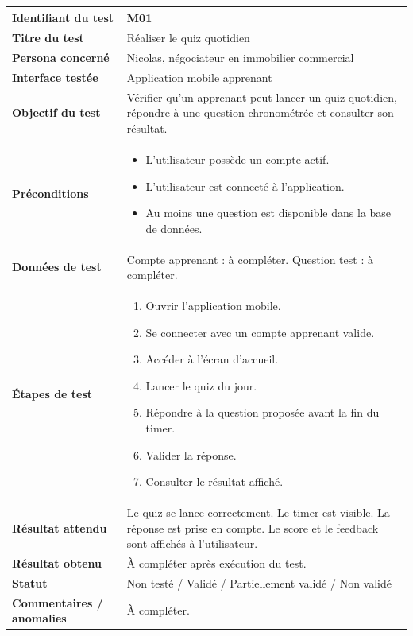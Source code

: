 \begin{longtable}{|p{4cm}|p{10cm}|}
\textbf{Identifiant du test} & M01 \\ \hline
\textbf{Titre du test} & Réaliser le quiz quotidien \\ \hline
\textbf{Persona concerné} & Nicolas, négociateur en immobilier commercial \\ \hline
\textbf{Interface testée} & Application mobile apprenant \\ \hline
\textbf{Objectif du test} & Vérifier qu'un apprenant peut lancer un quiz quotidien, répondre à une question chronométrée et consulter son résultat. \\ \hline
\textbf{Préconditions} & 
\begin{itemize}
    \item L'utilisateur possède un compte actif.
    \item L'utilisateur est connecté à l'application.
    \item Au moins une question est disponible dans la base de données.
\end{itemize}
\\ \hline
\textbf{Données de test} & 
Compte apprenant : à compléter. \newline
Question test : à compléter. \\ \hline
\textbf{Étapes de test} &
\begin{enumerate}
    \item Ouvrir l'application mobile.
    \item Se connecter avec un compte apprenant valide.
    \item Accéder à l'écran d'accueil.
    \item Lancer le quiz du jour.
    \item Répondre à la question proposée avant la fin du timer.
    \item Valider la réponse.
    \item Consulter le résultat affiché.
\end{enumerate}
\\ \hline
\textbf{Résultat attendu} & 
Le quiz se lance correctement. Le timer est visible. La réponse est prise en compte. Le score et le feedback sont affichés à l'utilisateur. \\ \hline
\textbf{Résultat obtenu} & À compléter après exécution du test. \\ \hline
\textbf{Statut} & Non testé / Validé / Partiellement validé / Non validé \\ \hline
\textbf{Commentaires / anomalies} & À compléter. \\
\end{longtable}
\endgroup

